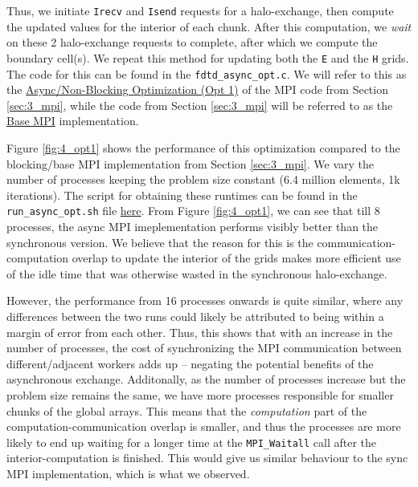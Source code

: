 \documentclass[a4paper,10pt]{article}
\begin{document}
Thus, we initiate  \verb|Irecv| and \verb|Isend| requests for a halo-exchange, then compute the updated values for the interior of each chunk. After this computation, we \textit{wait} on these 2 halo-exchange requests to complete, after which we compute the boundary cell(s). We repeat this method for updating both the \verb|E| and the \verb|H| grids. The code for this can be found in the \verb|fdtd_async_opt.c|. We will refer to this as the \underline{Async/Non-Blocking Optimization (Opt 1)} of the MPI code from Section \ref{sec:3_mpi}, while the code from Section \ref{sec:3_mpi} will be referred to as the \underline{Base MPI} implementation.

Figure \ref{fig:4_opt1} shows the performance of this optimization compared to the blocking/base MPI implementation from Section \ref{sec:3_mpi}. We vary the number of processes keeping the problem size constant (6.4 million elements, 1k iterations). The script for obtaining these runtimes can be found in the \verb|run_async_opt.sh| file \href{https://github.com/paulmyr/DD2356-MethodsHPC/blob/master/5_project/4_opt/run_async_opt.sh}{here}. From Figure \ref{fig:4_opt1}, we can see that till 8 processes, the async MPI imeplementation performs visibly better than the synchronous version. We believe that the reason for this is the communication-computation overlap to update the interior of the grids makes more efficient use of the idle time that was otherwise wasted in the synchronous halo-exchange.

However, the performance from 16 processes onwards is quite similar, where any differences between the two runs could likely be attributed to being within a margin of error from each other. Thus, this shows that with an increase in the number of processes, the cost of synchronizing the MPI communication between different/adjacent workers adds up -- negating the potential benefits of the asynchronous exchange. Additonally, as the number of processes increase but the problem size remains the same, we have more processes responsible for smaller chunks of the global arrays. This means that the \textit{computation} part of the computation-communication overlap is smaller, and thus the processes are more likely to end up waiting for a longer time at the \verb|MPI_Waitall| call after the interior-computation is finished. This would give us similar behaviour to the sync MPI implementation, which is what we observed.
\end{document}

